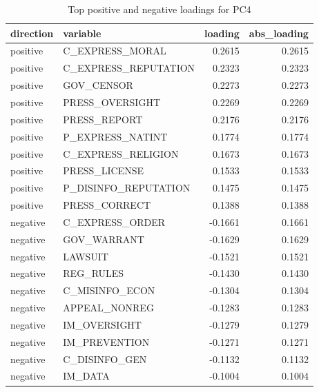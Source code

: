 \begin{table}
\caption{Top positive and negative loadings for PC4}
\label{tab:pc4_loadings}
\begin{tabular}{llrr}
\toprule
direction & variable & loading & abs_loading \\
\midrule
positive & C_EXPRESS_MORAL & 0.2615 & 0.2615 \\
positive & C_EXPRESS_REPUTATION & 0.2323 & 0.2323 \\
positive & GOV_CENSOR & 0.2273 & 0.2273 \\
positive & PRESS_OVERSIGHT & 0.2269 & 0.2269 \\
positive & PRESS_REPORT & 0.2176 & 0.2176 \\
positive & P_EXPRESS_NATINT & 0.1774 & 0.1774 \\
positive & C_EXPRESS_RELIGION & 0.1673 & 0.1673 \\
positive & PRESS_LICENSE & 0.1533 & 0.1533 \\
positive & P_DISINFO_REPUTATION & 0.1475 & 0.1475 \\
positive & PRESS_CORRECT & 0.1388 & 0.1388 \\
negative & C_EXPRESS_ORDER & -0.1661 & 0.1661 \\
negative & GOV_WARRANT & -0.1629 & 0.1629 \\
negative & LAWSUIT & -0.1521 & 0.1521 \\
negative & REG_RULES & -0.1430 & 0.1430 \\
negative & C_MISINFO_ECON & -0.1304 & 0.1304 \\
negative & APPEAL_NONREG & -0.1283 & 0.1283 \\
negative & IM_OVERSIGHT & -0.1279 & 0.1279 \\
negative & IM_PREVENTION & -0.1271 & 0.1271 \\
negative & C_DISINFO_GEN & -0.1132 & 0.1132 \\
negative & IM_DATA & -0.1004 & 0.1004 \\
\bottomrule
\end{tabular}
\end{table}
